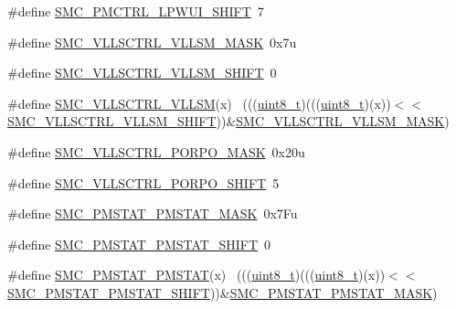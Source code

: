 \begin{DoxyCompactItemize}
\item 
\#define \hyperlink{group___s_m_c___register___masks_ga923f713c8f946601de6acd8088624b20}{S\+M\+C\+\_\+\+P\+M\+C\+T\+R\+L\+\_\+\+L\+P\+W\+U\+I\+\_\+\+S\+H\+I\+FT}~7
\item 
\#define \hyperlink{group___s_m_c___register___masks_ga4f4e91c4841316ab1eae1a74c0091ff4}{S\+M\+C\+\_\+\+V\+L\+L\+S\+C\+T\+R\+L\+\_\+\+V\+L\+L\+S\+M\+\_\+\+M\+A\+SK}~0x7u
\item 
\#define \hyperlink{group___s_m_c___register___masks_ga67af6c7ed0835ed408cf511e8b9c9b13}{S\+M\+C\+\_\+\+V\+L\+L\+S\+C\+T\+R\+L\+\_\+\+V\+L\+L\+S\+M\+\_\+\+S\+H\+I\+FT}~0
\item 
\#define \hyperlink{group___s_m_c___register___masks_ga344f6e0be6abf3a3a2e2e1972bd16155}{S\+M\+C\+\_\+\+V\+L\+L\+S\+C\+T\+R\+L\+\_\+\+V\+L\+L\+SM}(x)                                    ~(((\hyperlink{_p_e___types_8h_aba7bc1797add20fe3efdf37ced1182c5}{uint8\+\_\+t})(((\hyperlink{_p_e___types_8h_aba7bc1797add20fe3efdf37ced1182c5}{uint8\+\_\+t})(x))$<$$<$\hyperlink{group___s_m_c___register___masks_ga67af6c7ed0835ed408cf511e8b9c9b13}{S\+M\+C\+\_\+\+V\+L\+L\+S\+C\+T\+R\+L\+\_\+\+V\+L\+L\+S\+M\+\_\+\+S\+H\+I\+FT}))\&\hyperlink{group___s_m_c___register___masks_ga4f4e91c4841316ab1eae1a74c0091ff4}{S\+M\+C\+\_\+\+V\+L\+L\+S\+C\+T\+R\+L\+\_\+\+V\+L\+L\+S\+M\+\_\+\+M\+A\+SK})
\item 
\#define \hyperlink{group___s_m_c___register___masks_ga44691ea357e857b84a0f2f6db808ae0d}{S\+M\+C\+\_\+\+V\+L\+L\+S\+C\+T\+R\+L\+\_\+\+P\+O\+R\+P\+O\+\_\+\+M\+A\+SK}~0x20u
\item 
\#define \hyperlink{group___s_m_c___register___masks_ga255471752ad43100216590dba76a5a0e}{S\+M\+C\+\_\+\+V\+L\+L\+S\+C\+T\+R\+L\+\_\+\+P\+O\+R\+P\+O\+\_\+\+S\+H\+I\+FT}~5
\item 
\#define \hyperlink{group___s_m_c___register___masks_ga2574f973caed7a43c1d0b69888866f63}{S\+M\+C\+\_\+\+P\+M\+S\+T\+A\+T\+\_\+\+P\+M\+S\+T\+A\+T\+\_\+\+M\+A\+SK}~0x7\+Fu
\item 
\#define \hyperlink{group___s_m_c___register___masks_gaa4083ab43677e6a1b6832f6607a5ef0e}{S\+M\+C\+\_\+\+P\+M\+S\+T\+A\+T\+\_\+\+P\+M\+S\+T\+A\+T\+\_\+\+S\+H\+I\+FT}~0
\item 
\#define \hyperlink{group___s_m_c___register___masks_gaf42160e08664669fce172fdc170e9c5f}{S\+M\+C\+\_\+\+P\+M\+S\+T\+A\+T\+\_\+\+P\+M\+S\+T\+AT}(x)                                      ~(((\hyperlink{_p_e___types_8h_aba7bc1797add20fe3efdf37ced1182c5}{uint8\+\_\+t})(((\hyperlink{_p_e___types_8h_aba7bc1797add20fe3efdf37ced1182c5}{uint8\+\_\+t})(x))$<$$<$\hyperlink{group___s_m_c___register___masks_gaa4083ab43677e6a1b6832f6607a5ef0e}{S\+M\+C\+\_\+\+P\+M\+S\+T\+A\+T\+\_\+\+P\+M\+S\+T\+A\+T\+\_\+\+S\+H\+I\+FT}))\&\hyperlink{group___s_m_c___register___masks_ga2574f973caed7a43c1d0b69888866f63}{S\+M\+C\+\_\+\+P\+M\+S\+T\+A\+T\+\_\+\+P\+M\+S\+T\+A\+T\+\_\+\+M\+A\+SK})
\end{DoxyCompactItemize}



